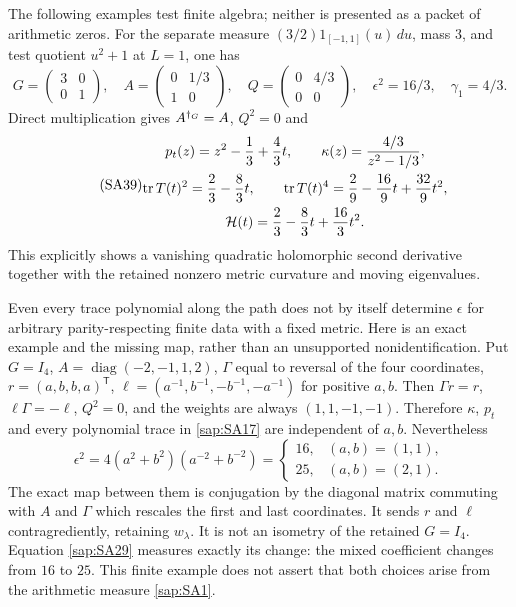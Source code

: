 \documentclass[11pt]{article}
\begin{document}
The following examples test finite algebra; neither
is presented as a packet of arithmetic zeros.
For the separate measure $(3/2)1_{[-1,1]}(u)\,du$,
mass $3$, and test quotient $u^2+1$ at $L=1$, one has
\begin{equation}\tag{SA38}\label{sap:SA38}
G=\begin{pmatrix}3&0\\0&1\end{pmatrix},\quad
A=\begin{pmatrix}0&1/3\\1&0\end{pmatrix},\quad
Q=\begin{pmatrix}0&4/3\\0&0\end{pmatrix},\quad
\epsilon^2=16/3,\quad\gamma_1=4/3 .
\end{equation}
Direct multiplication gives $A^{\dagger_G}=A$, $Q^2=0$ and
\begin{equation}\tag{SA39}\label{sap:SA39}
\begin{gathered}
p_t(z)=z^2-\frac13+\frac43t,\qquad
\kappa(z)=\frac{4/3}{z^2-1/3},\\
\operatorname{tr} T(t)^2=\frac23-\frac83t,\qquad
\operatorname{tr} T(t)^4=\frac29-\frac{16}{9}t+\frac{32}{9}t^2,\\
\mathcal H(t)=\frac23-\frac83t+\frac{16}{3}t^2.
\end{gathered}
\end{equation}
This explicitly shows a vanishing quadratic holomorphic
second derivative together with the retained nonzero
metric curvature and moving eigenvalues.

Even every trace polynomial along the path does not by
itself determine $\epsilon$ for arbitrary parity-respecting
finite data with a fixed metric. Here is an exact example
and the missing map, rather than an unsupported
nonidentification. Put $G=I_4$,
$A=\operatorname{diag}(-2,-1,1,2)$,
$\Gamma$ equal to reversal of the four coordinates,
$r=(a,b,b,a)^{\mathsf T}$,
$\ell=(a^{-1},b^{-1},-b^{-1},-a^{-1})$ for positive
$a,b$. Then $\Gamma r=r$, $\ell\Gamma=-\ell$,
$Q^2=0$, and the weights are always $(1,1,-1,-1)$.
Therefore $\kappa$, $p_t$ and every polynomial trace
in \eqref{sap:SA17} are independent of $a,b$. Nevertheless
\begin{equation}\tag{SA40}\label{sap:SA40}
\epsilon^2
=4(a^2+b^2)(a^{-2}+b^{-2})
=\begin{cases}16,&(a,b)=(1,1),\\25,&(a,b)=(2,1).\end{cases}
\end{equation}
The exact map between them is conjugation by the
diagonal matrix commuting with $A$ and $\Gamma$ which
rescales the first and last coordinates. It sends $r$
and $\ell$ contragrediently, retaining $w_\lambda$.
It is not an isometry of the retained $G=I_4$.
Equation \eqref{sap:SA29} measures exactly its change:
the mixed coefficient changes from $16$ to $25$.
This finite example does not assert that both choices
arise from the arithmetic measure \eqref{sap:SA1}.
\end{document}
